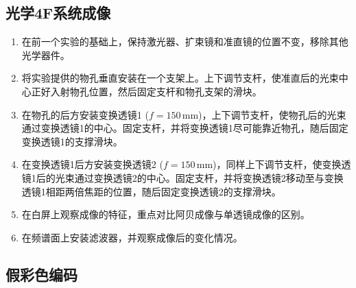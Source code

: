 \documentclass[UTF-8,twoside,cs4size]{ctexart}
\begin{document}
\subsection{光学4F系统成像}
\begin{enumerate}
    \item 在前一个实验的基础上，保持激光器、扩束镜和准直镜的位置不变，移除其他光学器件。
    
    \item 将实验提供的物孔垂直安装在一个支架上。上下调节支杆，使准直后的光束中心正好入射物孔位置，然后固定支杆和物孔支架的滑块。
    
    \item 在物孔的后方安装变换透镜1 (\(f = 150 \, \text{mm}\))，上下调节支杆，使物孔后的光束通过变换透镜1的中心。固定支杆，并将变换透镜1尽可能靠近物孔，随后固定变换透镜1的支撑滑块。
    
    \item 在变换透镜1后方安装变换透镜2 (\(f = 150 \, \text{mm}\))，同样上下调节支杆，使变换透镜1后的光束通过变换透镜2的中心。固定支杆，并将变换透镜2移动至与变换透镜1相距两倍焦距的位置，随后固定变换透镜2的支撑滑块。
    
    \item 在白屏上观察成像的特征，重点对比阿贝成像与单透镜成像的区别。
    
    \item 在频谱面上安装滤波器，并观察成像后的变化情况。
\end{enumerate}

\subsection{假彩色编码}
\end{document}
